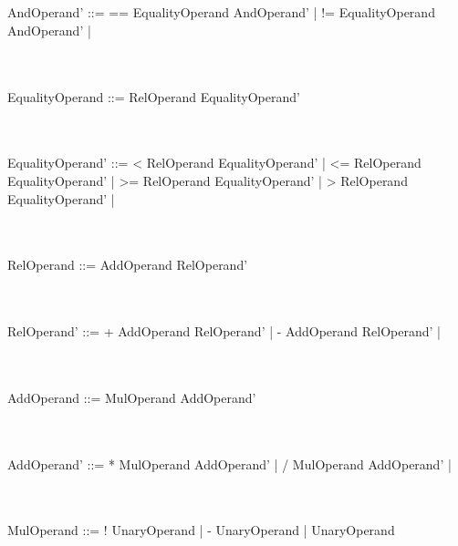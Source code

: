 \documentclass[a4paper,portrait,12pt]{article}
\begin{document}
\\~\\
AndOperand' ::=	== EqualityOperand AndOperand'	\newline
\hspace*{.625in} | != EqualityOperand AndOperand'	\newline
\hspace*{.625in} | \epsilon

\\~\\
EqualityOperand ::=	RelOperand EqualityOperand'

\\~\\
EqualityOperand' ::=	< RelOperand EqualityOperand'	\newline
\hspace*{.625in} | <= RelOperand EqualityOperand'		\newline
\hspace*{.625in} | >= RelOperand EqualityOperand'		\newline
\hspace*{.625in} | > RelOperand	EqualityOperand'		\newline
\hspace*{.625in} | \epsilon

\\~\\
RelOperand ::=	AddOperand RelOperand'			\newline

\\~\\
RelOperand' ::=	+ AddOperand RelOperand'		\newline
\hspace*{.625in} | - AddOperand	RelOperand' 	\newline
\hspace*{.625in} | \epsilon

\\~\\
AddOperand ::=	MulOperand AddOperand'			\newline

\\~\\
AddOperand' ::=	* MulOperand AddOperand'		\newline
\hspace*{.625in} | / MulOperand	AddOperand' 	\newline
\hspace*{.625in} | \epsilon

\\~\\
MulOperand ::=	! UnaryOperand				\newline
\hspace*{.625in} | - UnaryOperand			\newline
\hspace*{.625in} | UnaryOperand				\newline
\end{document}
